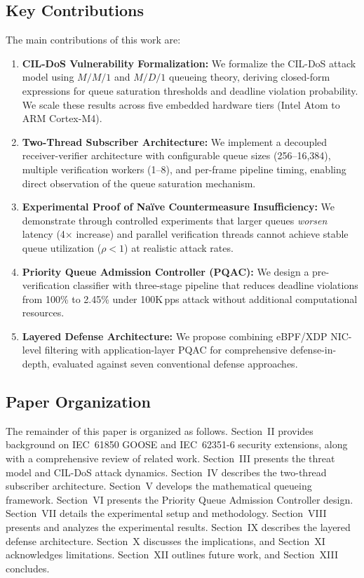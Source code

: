\documentclass[journal]{IEEEtran}
\begin{document}
\subsection{Key Contributions}
The main contributions of this work are:
\begin{enumerate}[leftmargin=*]
    \item \textbf{CIL-DoS Vulnerability Formalization:} We formalize the CIL-DoS attack model using $M/M/1$ and $M/D/1$ queueing theory, deriving closed-form expressions for queue saturation thresholds and deadline violation probability. We scale these results across five embedded hardware tiers (Intel Atom to ARM Cortex-M4).
    \item \textbf{Two-Thread Subscriber Architecture:} We implement a decoupled receiver-verifier architecture with configurable queue sizes (256--16,384), multiple verification workers (1--8), and per-frame pipeline timing, enabling direct observation of the queue saturation mechanism.
    \item \textbf{Experimental Proof of Na\"ive Countermeasure Insufficiency:} We demonstrate through controlled experiments that larger queues \emph{worsen} latency (4$\times$ increase) and parallel verification threads cannot achieve stable queue utilization ($\rho < 1$) at realistic attack rates.
    \item \textbf{Priority Queue Admission Controller (PQAC):} We design a pre-verification classifier with three-stage pipeline that reduces deadline violations from 100\% to 2.45\% under 100K\,pps attack without additional computational resources.
    \item \textbf{Layered Defense Architecture:} We propose combining eBPF/XDP NIC-level filtering with application-layer PQAC for comprehensive defense-in-depth, evaluated against seven conventional defense approaches.
\end{enumerate}

\subsection{Paper Organization}
The remainder of this paper is organized as follows. Section~II provides background on IEC~61850 GOOSE and IEC~62351-6 security extensions, along with a comprehensive review of related work. Section~III presents the threat model and CIL-DoS attack dynamics. Section~IV describes the two-thread subscriber architecture. Section~V develops the mathematical queueing framework. Section~VI presents the Priority Queue Admission Controller design. Section~VII details the experimental setup and methodology. Section~VIII presents and analyzes the experimental results. Section~IX describes the layered defense architecture. Section~X discusses the implications, and Section~XI acknowledges limitations. Section~XII outlines future work, and Section~XIII concludes.
\end{document}
